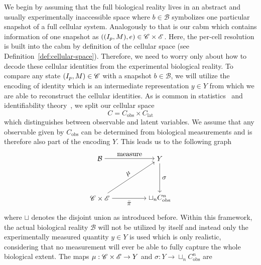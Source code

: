 We begin by assuming that the full biological reality lives in an abstract and usually
experimentally inaccessible space where $b\in\mathcal{B}$ symbolizes one particular snapshot of a
full cellular system.
Analogously to that is our \ac{cabm} which contains information of one snapshot as
$((I_p,M),e)\in\mathscr{C}\times\mathscr{E}$.
Here, the per-cell resolution is built into the \ac{cabm} by definition of the cellular space (see
Definition~\ref{def:cellular-space}).
Therefore, we need to worry only about how to decode these cellular identities from the experimental
biological reality.
To compare any state $(I_p,M)\in\mathscr{C}$ with a snapshot $b\in\mathcal{B}$, we will utilize the encoding
of identity which is an intermediate representation $y\in Y$ from which we are able to reconstruct
the cellular identities.
As is common in statistics~\cite{Dempster1977} and identifiability
theory~\cite{Raue2009,Raue2014,Bellman1970}, we split our cellular space
\begin{equation}
    C=C_\text{obs}\times C_\text{lat}
\end{equation}
which distinguishes between observable and latent variables.
We assume that any observable given by $C_\text{obs}$ can be determined from biological measurements
and is therefore also part of the encoding $Y$.
This leads us to the following graph
\begin{equation}
    \begin{tikzpicture}[baseline=(current  bounding  box.center)]
        \node (cs) at (0,-1) {$\CS\times\EV$};
        \node (b) at (0,1) {$\mathcal{B}$};
        \node (y) at (3,1) {$Y$};
        \node (id) at (3,-1) {$\sqcup_n C_\text{obs}^n$};
        \draw[->] (cs) -- node[below,sloped] {$\bar{\pi}$} ++ (id);
        \draw[->] (y) -- node[right] {$\sigma$} ++ (id);
        \draw[->] (cs) -- node[above,sloped] {$\mu$} ++ (y);
        \draw[->] (b) -- node[above,sloped] {measure} ++ (y);
    \end{tikzpicture}
    \label{graph:cellular-identity-encode-decode-measure}
\end{equation}
where $\sqcup$ denotes the disjoint union as introduced before.
Within this framework, the actual biological reality $\mathcal{B}$ will not be utilized by itself
and instead only the experimentally measured quantity $y\in Y$ is used which is only realistic,
considering that no measurement will ever be able to fully capture the whole biological extent.
The maps $\mu:\mathscr{C}\times\mathscr{E}\rightarrow Y$ and $\sigma:Y\rightarrow\sqcup_n C_\text{obs}^n$ are
